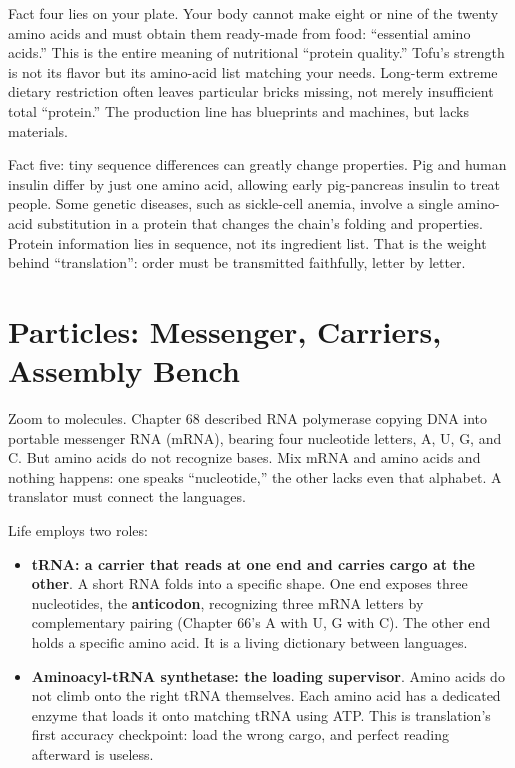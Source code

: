 Fact four lies on your plate. Your body cannot make eight or nine of the twenty amino acids and must obtain them ready-made from food: ``essential amino acids.'' This is the entire meaning of nutritional ``protein quality.'' Tofu's strength is not its flavor but its amino-acid list matching your needs. Long-term extreme dietary restriction often leaves particular bricks missing, not merely insufficient total ``protein.'' The production line has blueprints and machines, but lacks materials.

Fact five: tiny sequence differences can greatly change properties. Pig and human insulin differ by just one amino acid, allowing early pig-pancreas insulin to treat people. Some genetic diseases, such as sickle-cell anemia, involve a single amino-acid substitution in a protein that changes the chain's folding and properties. Protein information lies in sequence, not its ingredient list. That is the weight behind ``translation'': order must be transmitted faithfully, letter by letter.

\section{Particles: Messenger, Carriers, Assembly Bench}

Zoom to molecules. Chapter 68 described RNA polymerase copying DNA into portable messenger RNA (mRNA), bearing four nucleotide letters, A, U, G, and C. But amino acids do not recognize bases. Mix mRNA and amino acids and nothing happens: one speaks ``nucleotide,'' the other lacks even that alphabet. A translator must connect the languages.

Life employs two roles:

\begin{itemize}[itemsep=2pt]
\item \textbf{tRNA: a carrier that reads at one end and carries cargo at the other}. A short RNA folds into a specific shape. One end exposes three nucleotides, the \textbf{anticodon}, recognizing three mRNA letters by complementary pairing (Chapter 66's A with U, G with C). The other end holds a specific amino acid. It is a living dictionary between languages.
\item \textbf{Aminoacyl-tRNA synthetase: the loading supervisor}. Amino acids do not climb onto the right tRNA themselves. Each amino acid has a dedicated enzyme that loads it onto matching tRNA using ATP. This is translation's first accuracy checkpoint: load the wrong cargo, and perfect reading afterward is useless.
\end{itemize}

